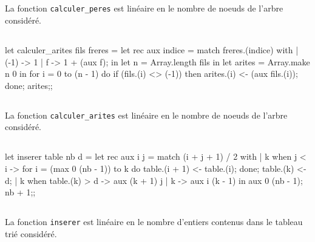 \documentclass{article}
\newcommand{\code}[1]{\lstinline[style = mystyle]{#1}}
\begin{document}
		\subsection{}
		
			La fonction \code{calculer_peres} est linéaire en le nombre de noeuds de l'arbre considéré. %
			
		\subsection{}
		
			\begin{case}
let calculer_arites fils freres =
	let rec aux indice = match freres.(indice) with
	| (-1) -> 1
	| f -> 1 + (aux f); in
	let n = Array.length fils in
		let arites = Array.make n 0 in
			for i = 0 to (n - 1) do
				if (fils.(i) <> (-1)) then
					arites.(i) <- (aux fils.(i));
			done;
	arites;;
			\end{case}
		
		\subsection{}
		
			La fonction \code{calculer_arites} est linéaire en le nombre de noeuds de l'arbre considéré.

		\subsection{}

			\begin{case}
let inserer table nb d =
	let rec aux i j = match (i + j + 1) / 2 with
	| k when j < i ->
		for i = (max 0 (nb - 1)) to k do
			table.(i + 1) <- table.(i);
		done;
		table.(k) <- d;
	| k when table.(k) > d -> aux (k + 1) j
	| k -> aux i (k - 1)
	in aux 0 (nb - 1);
	nb + 1;;
			\end{case}
			
		\subsection{}
		
			La fonction \code{inserer} est linéaire en le nombre d'entiers contenus dans le tableau trié considéré.
			
		\subsection{}
		
\end{document}
